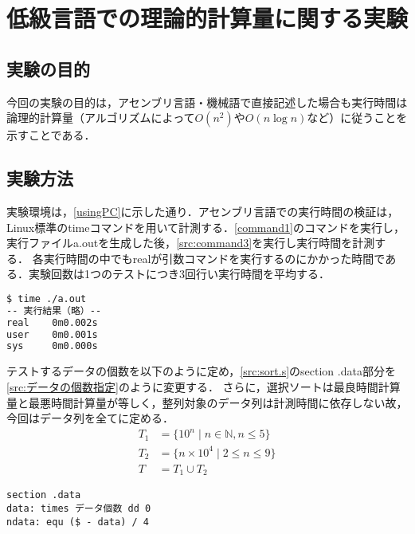 \chapter{低級言語での理論的計算量に関する実験}
\section{実験の目的}
今回の実験の目的は，アセンブリ言語・機械語で直接記述した場合も実行時間は論理的計算量（アルゴリズムによって\(O(n^2)\)や\(O(n\log n)\)など）に従うことを示すことである．
\section{実験方法}
実験環境は，\ref{usingPC}に示した通り．アセンブリ言語での実行時間の検証は，Linux標準の{\ttfamily time}コマンドを用いて計測する．\ref{command1}のコマンドを実行し，実行ファイル{\ttfamily a.out}を生成した後，\ref{src:command3}を実行し実行時間を計測する．
各実行時間の中でも{\ttfamily real}が引数コマンドを実行するのにかかった時間である．実験回数は1つのテストにつき3回行い実行時間を平均する．
\begin{lstlisting}[language={Bash},caption={実行コマンド},label={src:command3},frame={single},numbers={none}]
$ time ./a.out
-- 実行結果（略）--
real    0m0.002s
user    0m0.001s
sys     0m0.000s
\end{lstlisting}
テストするデータの個数を以下のように定め，\ref{src:sort.s}の{\ttfamily section .data}部分を\ref{src:データの個数指定}のように変更する．
さらに，選択ソートは最良時間計算量と最悪時間計算量が等しく，整列対象のデータ列は計測時間に依存しない故，今回はデータ列を全て{}に定める．
\begin{align*}
    T_1 & =\{10^n\mid n\in\mathbb{N}, n\leq 5\} \\
    T_2 & =\{n\times 10^4\mid 2\leq n\leq 9\}   \\
    T   & =T_1\cup T_2\tag*{(データ数)}
\end{align*}
\begin{lstlisting}[caption={データの個数指定}, label={src:データの個数指定},frame={single},numbers={none}]
    section .data
data: times データ個数 dd 0
ndata: equ ($ - data) / 4
\end{lstlisting}
